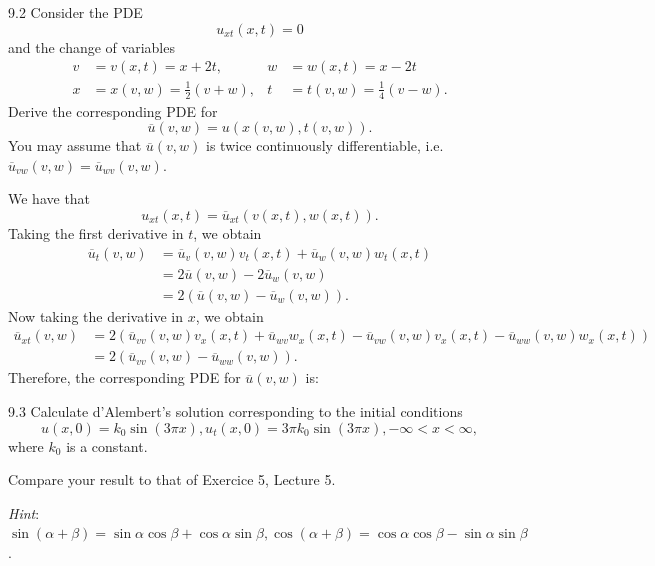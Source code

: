 \newpage

\begin{problem}{9.2}
  Consider the PDE
  \[ 
  u_{xt}(x,t) = 0
  \]
  and the change of variables
  \begin{align*}
    v &= v(x,t) = x + 2t, & w &= w(x,t) = x - 2t \\
    x &= x(v,w) = \frac{1}{2}(v+w), & t &= t(v,w) = \frac{1}{4}(v-w)
  .\end{align*}
  Derive the corresponding PDE for
  \[ 
  \overline{u}(v,w) = u (x(v,w), t(v,w))
  .\]
  You may assume that $\overline{u}(v,w)$ is twice continuously differentiable, i.e. $\overline{u}_{vw}(v,w) = \overline{u}_{wv}(v, w)$.
\end{problem}

\begin{derivation}
  We have that
  \[ 
  u_{xt} (x,t) = \overline{u}_{xt}(v(x,t), w(x,t))
  .\]
  Taking the first derivative in $t$, we obtain
  \begin{align*}
    \overline{u}_t(v,w) &= \overline{u}_v(v,w)v_t(x,t) + \overline{u}_w (v,w)w_t(x,t) \\
    &= 2\overline{u}(v,w) - 2 \overline{u}_w(v,w) \\
    &= 2 \left( \overline{u}(v,w) - \overline{u}_w(v,w) \right)
  .\end{align*}
  Now taking the derivative in $x$, we obtain
  \begin{align*}
    \overline{u}_{xt}(v,w) &= 2 \left( \overline{u}_{vv} (v,w) v_x(x,t) + \overline{u}_{wv}w_x(x,t) - \overline{u}_{vw}(v,w)v_x(x,t) - \overline{u}_{ww}(v,w) w_x(x,t) \right) \\
    &= 2 \left( \overline{u}_{vv}(v,w) - \overline{u}_{ww}(v,w) \right)
  .\end{align*}
  Therefore, the corresponding PDE for $\overline{u}(v,w)$ is:
\end{derivation}




\begin{problem}{9.3}
  Calculate d'Alembert's solution corresponding to the initial conditions
  \[ 
  u(x,0) = k_0 \sin \left( 3 \pi x \right), u_t (x,0) = 3 \pi k_0 \sin \left( 3 \pi x \right), - \infty < x < \infty
  ,\]
  where $k_0$ is a constant.

  Compare your result to that of Exercice 5, Lecture 5.

  \textit{Hint}: $\sin \left( \alpha + \beta \right) = \sin \alpha \cos \beta + \cos \alpha \sin \beta, \cos(\alpha + \beta) = \cos \alpha \cos \beta - \sin \alpha \sin \beta$.
\end{problem}

